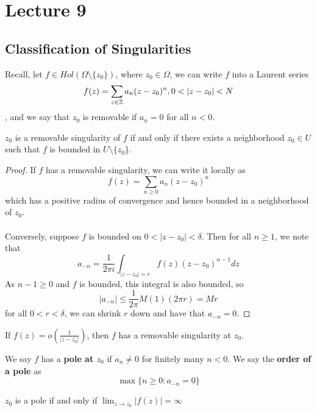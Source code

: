 \section{Lecture 9}

\subsection{Classification of Singularities}

Recall, let $f \in Hol(\Omega \setminus \{z_0\})$, where $z_0 \in \Omega$, we can write $f$ into a Laurent series
\[f(z) = \sum_{z \in \mathbb{Z}} a_n (z - z_0)^n, 0 < |z - z_0| < N\]
, and we say that $z_0$ is removable if $a_n = 0$ for all $n < 0$.

\begin{theorem}
$z_0$ is a removable singularity of $f$ if and only if there exists a neighborhood $z_0 \in U$ such that $f$ is bounded in $U \setminus \{z_0\}$.
\end{theorem}

\begin{proof}
If $f$ has a removable singularity, we can write it locally as
\[f(z) = \sum_{n \geq 0} a_n (z - z_0)^n\]
which has a positive radius of convergence and hence bounded in a neighborhood of $z_0$.\\\\
Conversely, suppose $f$ is bounded on $0 < |z - z_0| < \delta$. Then for all $n \geq 1$, we note that
\[a_{-n} = \frac{1}{2\pi i} \int_{|z - z_0| = r} f(z) (z - z_0)^{n-1} dz \]
As $n-1 \geq 0$ and $f$ is bounded, this integral is also bounded, so
\[|a_{-n}| \leq \frac{1}{2\pi} M (1) (2\pi r) = Mr\]
for all $0 < r < \delta$, we can shrink $r$ down and have that $a_{-n} = 0$.
\end{proof}

\begin{remark}
If $f(z) = o(\frac{1}{|z - z_0|})$, then $f$ has a removable singularity at $z_0$.
\end{remark}

We say $f$ has a \textbf{pole at $z_0$} if $a_n \neq 0$ for finitely many $n < 0$. We say the \textbf{order of a pole} as
        \[\max \{n \geq 0: a_{-n} = 0\}\]
        
\begin{theorem}
$z_0$ is a pole if and only if $\lim_{z \to z_0} |f(z)| = \infty$
\end{theorem}

